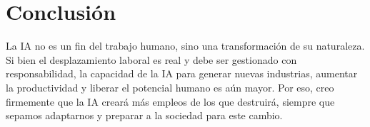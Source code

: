 \documentclass[12pt, a4paper, twoside]{article}
\begin{document}
\section{Conclusión}

La IA no es un fin del trabajo humano, sino una transformación de su naturaleza. Si bien el desplazamiento laboral es real y debe ser gestionado con responsabilidad, la capacidad de la IA para generar nuevas industrias, aumentar la productividad y liberar el potencial humano es aún mayor. Por eso, creo firmemente que la IA creará más empleos de los que destruirá, siempre que sepamos adaptarnos y preparar a la sociedad para este cambio.


\end{document}
